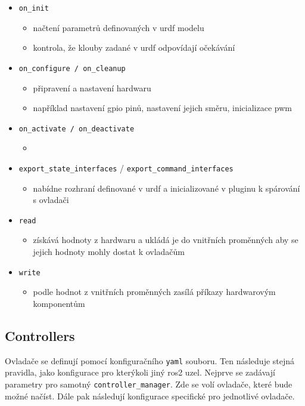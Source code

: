 \newpage
\begin{itemize}[leftmargin=*]
	\item{\verb|on_init|}
	\vspace*{-0.5em}
	\begin{itemize}
		\item{načtení parametrů definovaných v urdf modelu}
		\item{kontrola, že klouby zadané v urdf odpovídají očekávání}
	\end{itemize}
	\item{\verb|on_configure / on_cleanup|}
	\vspace*{-0.5em}
	\begin{itemize}
		\item{připravení a nastavení hardwaru}
		\item{například nastavení gpio pinů, nastavení jejich směru, inicializace pwm}
	\end{itemize}
	\item{\verb|on_activate / on_deactivate|}
	\vspace*{-0.5em}
	\begin{itemize}
		\item{}
	\end{itemize}
	\item{\verb|export_state_interfaces| / \verb|export_command_interfaces|}
	\vspace*{-0.5em}
	\begin{itemize}
		\item{nabídne rozhraní definované v urdf a inicializované v pluginu k spárování s ovladači}
	\end{itemize}
	\item{\verb|read|}
	\vspace*{-0.5em}
	\begin{itemize}
		\item{získává hodnoty z hardwaru a ukládá je do vnitřních proměnných aby se jejich hodnoty mohly dostat k ovladačům}
	\end{itemize}
	\item{\verb|write|}
	\vspace*{-0.5em}
	\begin{itemize}
		\item{podle hodnot z vnitřních proměnných zasílá příkazy hardwarovým komponentům}
	\end{itemize}
\end{itemize}

\subsection*{Controllers}
Ovladače se definují pomocí konfiguračního \verb|yaml| souboru. Ten následuje stejná pravidla, jako konfigurace pro kterýkoli jiný ros2 uzel. Nejprve se zadávají parametry pro samotný \verb|controller_manager|. Zde se volí ovladače, které bude možné načíst. Dále pak následují konfigurace specifické pro jednotlivé ovladače.

